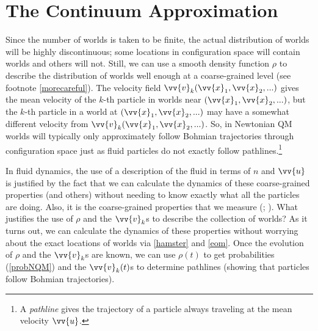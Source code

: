 \documentclass[12pt,secnumarabic,balancelastpage,amsmath,amssymb,nofootinbib]{article}
\begin{document}
\section{The Continuum Approximation}\label{badstates}

Since the number of worlds is taken to be finite, the actual distribution of worlds will be highly discontinuous; some locations in configuration space will contain worlds and others will not.  Still, we can use a smooth density function $\rho$ to describe the distribution of worlds well enough at a coarse-grained level (see footnote \ref{morecareful}).  The velocity field $\vv{v}_k(\vv{x}_1,\vv{x}_2,...)$ gives the mean velocity of the $k$-th particle in worlds near $(\vv{x}_1,\vv{x}_2,...)$, but the $k$-th particle in a world at $(\vv{x}_1,\vv{x}_2,...)$ may have a somewhat different velocity from $\vv{v}_k(\vv{x}_1,\vv{x}_2,...)$.  So, in Newtonian QM worlds will typically only approximately follow Bohmian trajectories through configuration space just as fluid particles do not exactly follow pathlines.\footnote{A \emph{pathline} gives the trajectory of a particle always traveling at the mean velocity $\vv{u}$.}

In fluid dynamics, the use of a description of the fluid in terms of $n$ and $\vv{u}$ is justified by the fact that we can calculate the dynamics of these coarse-grained properties (and others) without needing to know exactly what all the particles are doing.  Also, it is the coarse-grained properties that we measure (\citealp[]{batchelor1967}; \citealp[]{chapman1970}).  What justifies the use of $\rho$ and the $\vv{v}_k$s to describe the collection of worlds?  As it turns out, we can calculate the dynamics of these properties without worrying about the exact locations of worlds via \eqref{hamster} and \eqref{eom}.  Once the evolution of $\rho$ and the $\vv{v}_k$s are known, we can use $\rho(t)$ to get probabilities (\textsection \ref{probNQM}) and the $\vv{v}_k(t)$s to determine pathlines (showing that particles follow Bohmian trajectories).
\end{document}
